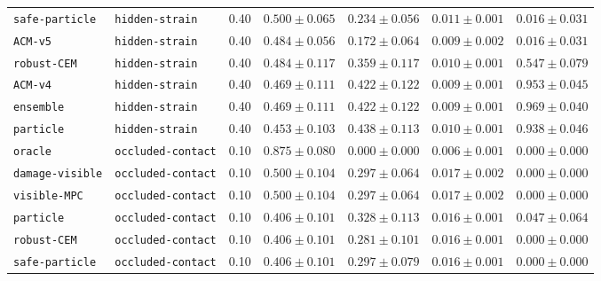 \documentclass{article}
\begin{document}
\begin{center}
\begin{tabular}{llccccc}
\texttt{safe-particle} & \texttt{hidden-strain} & 0.40 & $0.500 \pm 0.065$ & $0.234 \pm 0.056$ & $0.011 \pm 0.001$ & $0.016 \pm 0.031$ \\
\texttt{ACM-v5} & \texttt{hidden-strain} & 0.40 & $0.484 \pm 0.056$ & $0.172 \pm 0.064$ & $0.009 \pm 0.002$ & $0.016 \pm 0.031$ \\
\texttt{robust-CEM} & \texttt{hidden-strain} & 0.40 & $0.484 \pm 0.117$ & $0.359 \pm 0.117$ & $0.010 \pm 0.001$ & $0.547 \pm 0.079$ \\
\texttt{ACM-v4} & \texttt{hidden-strain} & 0.40 & $0.469 \pm 0.111$ & $0.422 \pm 0.122$ & $0.009 \pm 0.001$ & $0.953 \pm 0.045$ \\
\texttt{ensemble} & \texttt{hidden-strain} & 0.40 & $0.469 \pm 0.111$ & $0.422 \pm 0.122$ & $0.009 \pm 0.001$ & $0.969 \pm 0.040$ \\
\texttt{particle} & \texttt{hidden-strain} & 0.40 & $0.453 \pm 0.103$ & $0.438 \pm 0.113$ & $0.010 \pm 0.001$ & $0.938 \pm 0.046$ \\
\texttt{oracle} & \texttt{occluded-contact} & 0.10 & $0.875 \pm 0.080$ & $0.000 \pm 0.000$ & $0.006 \pm 0.001$ & $0.000 \pm 0.000$ \\
\texttt{damage-visible} & \texttt{occluded-contact} & 0.10 & $0.500 \pm 0.104$ & $0.297 \pm 0.064$ & $0.017 \pm 0.002$ & $0.000 \pm 0.000$ \\
\texttt{visible-MPC} & \texttt{occluded-contact} & 0.10 & $0.500 \pm 0.104$ & $0.297 \pm 0.064$ & $0.017 \pm 0.002$ & $0.000 \pm 0.000$ \\
\texttt{particle} & \texttt{occluded-contact} & 0.10 & $0.406 \pm 0.101$ & $0.328 \pm 0.113$ & $0.016 \pm 0.001$ & $0.047 \pm 0.064$ \\
\texttt{robust-CEM} & \texttt{occluded-contact} & 0.10 & $0.406 \pm 0.101$ & $0.281 \pm 0.101$ & $0.016 \pm 0.001$ & $0.000 \pm 0.000$ \\
\texttt{safe-particle} & \texttt{occluded-contact} & 0.10 & $0.406 \pm 0.101$ & $0.297 \pm 0.079$ & $0.016 \pm 0.001$ & $0.000 \pm 0.000$ \\
\bottomrule
\end{tabular}
\end{center}
\end{document}
